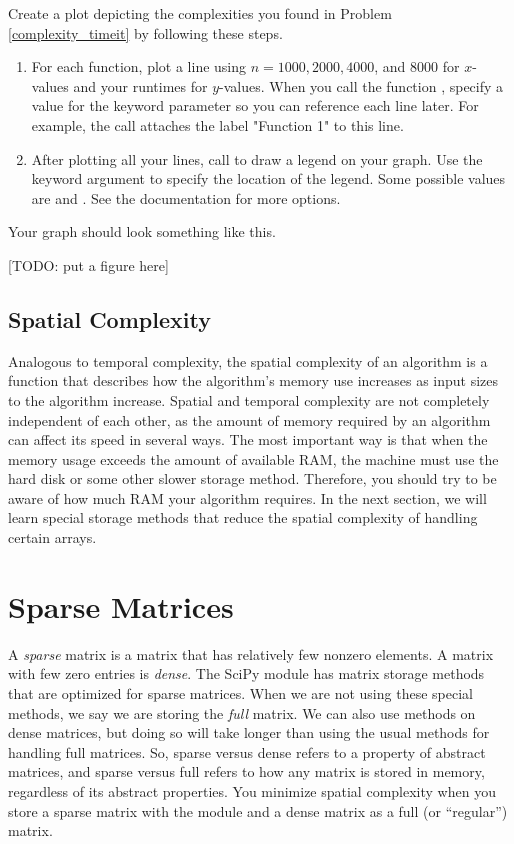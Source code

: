 \begin{problem}
Create a plot depicting the complexities you found in Problem \ref{complexity_timeit} by following these steps. 
\begin{enumerate}
\item For each function, plot a line using $n=1000, 2000, 4000$, and $8000$ for $x$-values and your runtimes for $y$-values. When you call the function , specify a value for the keyword parameter  so you can reference each line later. For example, the call  attaches the label "Function 1" to this line.
\item After plotting all your lines, call  to draw a legend on your graph. Use the keyword argument  to specify the location of the legend. Some possible values are  and . See the documentation for more options.
\end{enumerate}
Your graph should look something like this.

[TODO: put a figure here]
\end{problem}



\subsection*{Spatial Complexity}
Analogous to temporal complexity, the spatial complexity of an algorithm is a function that describes how the algorithm's memory use increases as input sizes to the algorithm increase. Spatial and temporal complexity are not completely independent of each other, as the amount of memory required by an algorithm can affect its speed in several ways. The most important way is that when the memory usage exceeds the amount of available RAM, the machine must use the hard disk or some other slower storage method. Therefore, you should try to be aware of how much RAM your algorithm requires. In the next section, we will learn special storage methods that reduce the spatial complexity of handling certain arrays.

\section*{Sparse Matrices}
A \emph{sparse} matrix is a matrix that has relatively few nonzero elements. A matrix with few zero entries is \emph{dense}. The SciPy module  has matrix storage methods that are optimized for sparse matrices. When we are not using these special methods, we say we are storing the \emph{full} matrix. We can also use  methods on dense matrices, but doing so will take longer than using the usual methods for handling full matrices. So, sparse versus dense refers to a property of abstract matrices, and sparse versus full refers to how any matrix is stored in memory, regardless of its abstract properties. You minimize spatial complexity when you store a sparse matrix with the  module and a dense matrix as a full (or ``regular'') matrix.

